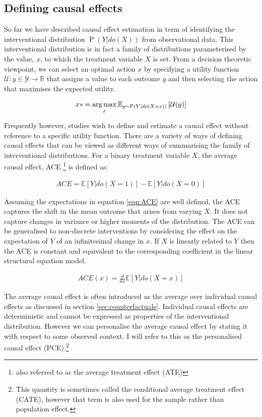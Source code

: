 \documentclass[11pt,a4paper,oneside]{book}
\newcommand{\Esub}[2]{\mathbb E_{#1}\left[{#2}\right]}
\newcommand{\E}[1]{\mathbb E\left[{#1}\right]}
\newcommand{\argmax}{\operatornamewithlimits{arg\,max}}
\newcommand{\eqn}[1]{\begin{align}#1\end{align}}
\renewcommand{\P}[1]{\operatorname{P}\left(#1\right)}
\theoremstyle{plain}
\theoremstyle{definition}
\begin{document}
\subsection{Defining causal effects} 
So far we have described causal effect estimation in term of identifying the interventional distribution $\P{Y|do(X)}$ from observational data. This interventional distribution is in fact a family of distributions parameterised by the value, $x$, to which the treatment variable $X$ is set. From a decision theoretic viewpoint, we can select an optimal action $x$ by specifying a utility function $\mathcal{U}:y \in \mathcal{Y} \rightarrow \mathbb{R}$ that assigns a value to each outcome $y$ and then selecting the action that maximises the expected utility. 

\eqn{
\label{eqn:utility_max}
x* =\argmax_x \Esub{y\sim\P{Y|do(X=x)}}{{\cal{U}}(y)}
} 

Frequently however, studies wish to define and estimate a causal effect without reference to a specific utility function. There are a variety of ways of defining causal effects that can be viewed as different ways of summarising the family of interventional distributions. For a binary treatment variable $X$, the average causal effect, ACE \footnote{also referred to as the average treatment effect (ATE)} is defined as:

\eqn{
\label{eqn:ACE}
ACE = \E{Y|do(X = 1)} - \E{Y|do(X=0)}
}

Assuming the expectations in equation \ref{eqn:ACE} are well defined, the ACE captures the shift in the mean outcome that arises from varying $X$. It does not capture changes in variance or higher moments of the distribution. The ACE can be generalised to non-discrete interventions by considering the effect on the expectation of $Y$ of an infinitesimal change in $x$. If $X$ is linearly related to $Y$ then the ACE is constant and equivalent to the corresponding coefficient in the linear structural equation model. 

\eqn{
\label{eqn:ACE_continuous}
ACE(x) = \frac{d}{dx}\E{Y|do(X=x)}
}


The average causal effect is often introduced as the average over individual causal effects as discussed in section \ref{sec:counterfactuals}. Individual causal effects are deterministic and cannot be expressed as properties of the interventional distribution. However we can personalise the average causal effect by stating it with respect to some observed context. I will refer to this as the personalised causal effect (PCE).\footnote{This quantity is sometimes called the conditional average treatment effect (CATE), however that term is also used for the sample rather than population effect.} 
\end{document}
